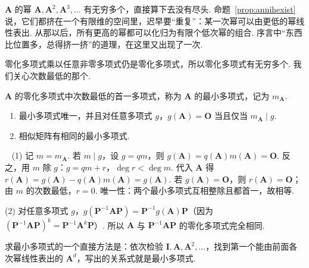 \documentclass[lang=cn,10.5pt,scheme=chinese,toc=twocol,section,chinesefont=nofont,
twoside,citestyle=gb7714-2015,bibstyle=gb7714-2015]{elegantbook}
\DeclareRobustCommand{\textbf}[1]{{\lnsemiboldlatin\lnsemiboldcjk #1}}
\newcommand{\vv}[1]{\boldsymbol{#1}}
\numberwithin{equation}{section}   %
\newcommand*{\lnlabel}[1]{{\sffamily\bfseries\color{black}#1}}
\renewenvironment{proof}{%
	\par\noindent\lnlabel{\proofname}\;\ \color{black!90}\cfs}{\par}
\begin{document}
\begin{motivebox}
  $\vv A$ 的幂 $\vv A,\vv A^2,\vv A^3,\ldots$ 有无穷多个，直接算下去没有尽头. 命题~\ref{prop:annihexist} 说，它们都挤在一个有限维的空间里，迟早要“重复”：某一次幂可以由更低的幂线性表出. 从那以后，所有更高的幂都可以化归为有限个低次幂的组合. 序言中“东西比位置多，总得挤一挤”的道理，在这里又出现了一次.
\end{motivebox}

零化多项式乘以任意非零多项式仍是零化多项式，所以零化多项式有无穷多个. 我们关心次数最低的那个.

\begin{definition}
  $\vv A$ 的零化多项式中次数最低的首一多项式，称为 $\vv A$ 的\textbf{最小多项式}，记为 $m_{\vv A}$.
\end{definition}

\begin{theorem}
  \label{thm:minpoly}
  \begin{enumerate}
    \item 最小多项式唯一，并且对任意多项式 $g$，$g(\vv A)=\vv O$ 当且仅当 $m_{\vv A}\mid g$.
    \item 相似矩阵有相同的最小多项式.
  \end{enumerate}
\end{theorem}
\begin{proof}
  (1) 记 $m=m_{\vv A}$. 若 $m\mid g$，设 $g=qm$，则 $g(\vv A)=q(\vv A)m(\vv A)=\vv O$. 反之，用 $m$ 除 $g$：$g=qm+r$，$\deg r<\deg m$. 代入 $\vv A$ 得 $r(\vv A)=g(\vv A)-q(\vv A)m(\vv A)=g(\vv A)$. 若 $g(\vv A)=\vv O$，则 $r(\vv A)=\vv O$；由 $m$ 的次数最低，$r=0$. 唯一性：两个最小多项式互相整除且都首一，故相等.

  (2) 对任意多项式 $g$，$g(\vv P^{-1}\vv{AP})=\vv P^{-1}g(\vv A)\vv P$（因为 $(\vv P^{-1}\vv{AP})^k=\vv P^{-1}\vv A^k\vv P$）. 所以 $\vv A$ 与 $\vv P^{-1}\vv{AP}$ 的零化多项式完全相同.
\end{proof}

求最小多项式的一个直接方法是：依次检验 $\vv I,\vv A,\vv A^2,\ldots$，找到第一个能由前面各次幂线性表出的 $\vv A^d$，写出的关系式就是最小多项式.
\end{document}
